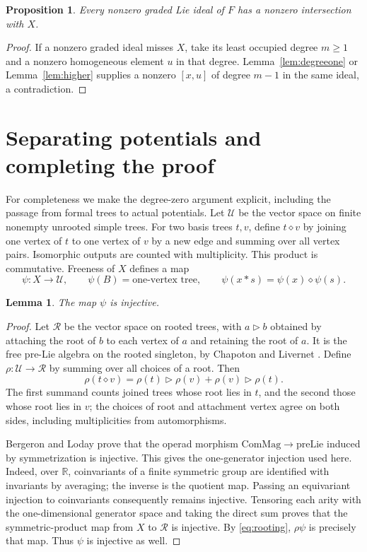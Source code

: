 \documentclass[11pt]{article}
\newtheorem{lemma}[theorem]{Lemma}
\newtheorem{proposition}[theorem]{Proposition}
\newcommand{\R}{\mathbb R}
\begin{document}
\begin{proposition}\label{prop:ideal}
Every nonzero graded Lie ideal of $F$ has a nonzero intersection with $X$.
\end{proposition}
\begin{proof}
If a nonzero graded ideal misses $X$, take its least occupied degree
$m\ge1$ and a nonzero homogeneous element $u$ in that degree.
Lemma~\ref{lem:degreeone} or Lemma~\ref{lem:higher} supplies a nonzero
$[x,u]$ of degree $m-1$ in the same ideal, a contradiction.
\end{proof}

\section{Separating potentials and completing the proof}\label{sec:potentials}

For completeness we make the degree-zero argument explicit, including the
passage from formal trees to actual potentials. Let $\mathcal U$ be the
vector space on finite nonempty unrooted simple trees. For two basis trees
$t,v$, define $t\diamond v$ by joining one vertex of $t$ to one vertex of
$v$ by a new edge and summing over all vertex pairs. Isomorphic outputs
are counted with multiplicity. This product is commutative. Freeness of $X$
defines a map
\[
 \psi:X\longrightarrow\mathcal U,\qquad
 \psi(B)=\text{one-vertex tree},\qquad
 \psi(x*s)=\psi(x)\diamond\psi(s).
\]

\begin{lemma}\label{lem:unrooted}
The map $\psi$ is injective.
\end{lemma}
\begin{proof}
Let $\mathcal R$ be the vector space on rooted trees, with
$a\triangleright b$ obtained by attaching the root of $b$ to each vertex of
$a$ and retaining the root of $a$. It is the free pre-Lie algebra on the
rooted singleton, by Chapoton and Livernet \cite[Theorem~1.9 and
Corollary~1.10]{CL}. Define $\rho:\mathcal U\to\mathcal R$ by summing over
all choices of a root. Then
\begin{equation}\label{eq:rooting}
 \rho(t\diamond v)=\rho(t)\triangleright\rho(v)
                         +\rho(v)\triangleright\rho(t).
\end{equation}
The first summand counts joined trees whose root lies in $t$, and the second
those whose root lies in $v$; the choices of root and attachment vertex agree
on both sides, including multiplicities from automorphisms.

Bergeron and Loday \cite[Theorem~3.1]{BL} prove that the operad morphism
$\mathrm{ComMag}\to\mathrm{preLie}$ induced by symmetrization is injective.
This gives the one-generator injection used here. Indeed, over $\R$,
coinvariants of a finite symmetric group are identified with invariants by
averaging; the inverse is the quotient map. Passing an equivariant injection
to coinvariants consequently remains injective. Tensoring each arity with
the one-dimensional generator space and taking the direct sum proves that
the symmetric-product map from $X$ to $\mathcal R$ is injective.
By \eqref{eq:rooting}, $\rho\psi$ is precisely that map. Thus $\psi$ is
injective as well.
\end{proof}
\end{document}
